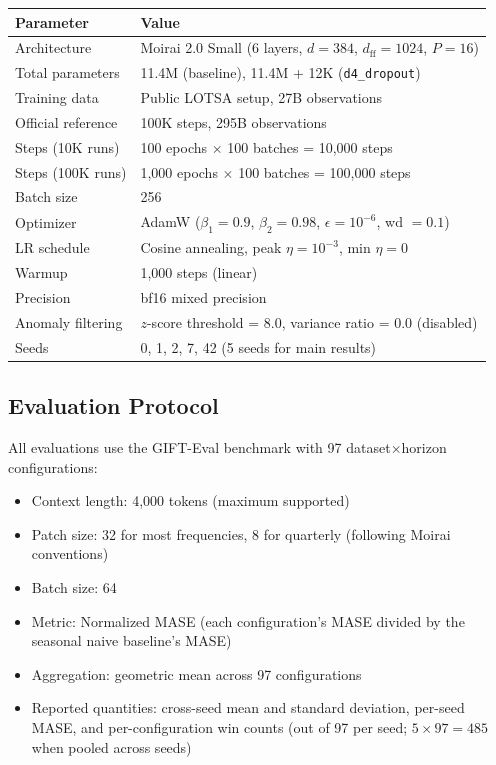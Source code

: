 \documentclass{article}
\begin{document}
\begin{center}
\small
\begin{tabular}{ll}
\toprule
\textbf{Parameter} & \textbf{Value} \\
\midrule
Architecture & Moirai 2.0 Small (6 layers, $d=384$, $d_{\text{ff}}=1024$, $P=16$) \\
Total parameters & 11.4M (baseline), 11.4M + 12K (\texttt{d4\_dropout}) \\
Training data & Public LOTSA setup, 27B observations \\
Official reference & 100K steps, 295B observations \\
Steps (10K runs) & 100 epochs $\times$ 100 batches = 10,000 steps \\
Steps (100K runs) & 1,000 epochs $\times$ 100 batches = 100,000 steps \\
Batch size & 256 \\
Optimizer & AdamW ($\beta_1=0.9$, $\beta_2=0.98$, $\epsilon=10^{-6}$, wd $=0.1$) \\
LR schedule & Cosine annealing, peak $\eta = 10^{-3}$, min $\eta = 0$ \\
Warmup & 1,000 steps (linear) \\
Precision & bf16 mixed precision \\
Anomaly filtering & $z$-score threshold = 8.0, variance ratio = 0.0 (disabled) \\
Seeds & 0, 1, 2, 7, 42 (5 seeds for main results) \\
\bottomrule
\end{tabular}
\end{center}

\subsection{Evaluation Protocol}

All evaluations use the GIFT-Eval benchmark \citep{vijay2024gifteval} with 97 dataset$\times$horizon configurations:
\begin{itemize}
    \item Context length: 4,000 tokens (maximum supported)
    \item Patch size: 32 for most frequencies, 8 for quarterly (following Moirai conventions)
    \item Batch size: 64
    \item Metric: Normalized MASE (each configuration's MASE divided by the seasonal naive baseline's MASE)
    \item Aggregation: geometric mean across 97 configurations
    \item Reported quantities: cross-seed mean and standard deviation, per-seed MASE, and per-configuration win counts (out of 97 per seed; $5 \times 97 = 485$ when pooled across seeds)
\end{itemize}
\end{document}
